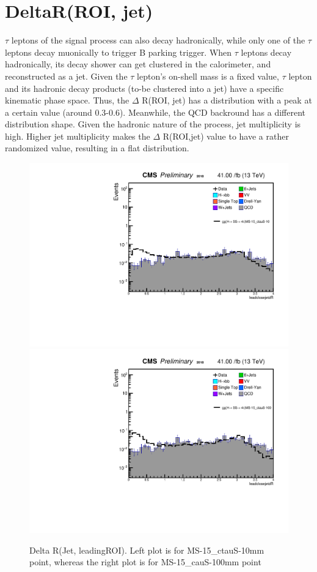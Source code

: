 \section{DeltaR(ROI, jet)}\label{ref:jetdR}
$\tau$ leptons of the signal process can also decay hadronically, while only one of the $\tau$ leptons decay muonically to trigger B parking trigger.
When $\tau$ leptons decay hadronically, its decay shower can get clustered in the calorimeter, and reconstructed as a jet.
Given the $\tau$ lepton's on-shell mass is a fixed value, $\tau$ lepton and its hadronic decay products (to-be clustered into a jet) have a specific kinematic phase space.
Thus, the $\Delta$ R(ROI, jet) has a distribution with a peak at a certain value (around 0.3-0.6).
Meanwhile, the QCD backround has a different distribution shape.
Given the hadronic nature of the process, jet multiplicity is high. 
Higher jet multiplicity makes the $\Delta$ R(ROI,jet) value to have a rather randomized value, resulting in a flat distribution. 

 \begin{figure}[h!]
   \caption{Delta R(Jet, leadingROI). Left plot is for MS-15\_ctauS-10mm point, whereas the right plot is for MS-15\_cauS-100mm point}
   \label{fig:ANleadSize}
   \centering
   \includegraphics[width=0.47\linewidth]{figs/AnalysisNoteplot_MS-15_ctauS-10_leadclosejetdR.pdf}
   \includegraphics[width=0.47\linewidth]{figs/AnalysisNoteplot_MS-15_ctauS-100_leadclosejetdR.pdf}
 \end{figure}





